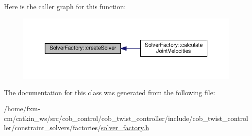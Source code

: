 Here is the caller graph for this function\-:
\nopagebreak
\begin{figure}[H]
\begin{center}
\leavevmode
\includegraphics[width=350pt]{classSolverFactory_a49a73417f779159054fee4f6218ce7c8_icgraph}
\end{center}
\end{figure}




The documentation for this class was generated from the following file\-:\begin{DoxyCompactItemize}
\item 
/home/fxm-\/cm/catkin\-\_\-ws/src/cob\-\_\-control/cob\-\_\-twist\-\_\-controller/include/cob\-\_\-twist\-\_\-controller/constraint\-\_\-solvers/factories/\hyperlink{solver__factory_8h}{solver\-\_\-factory.\-h}\end{DoxyCompactItemize}
